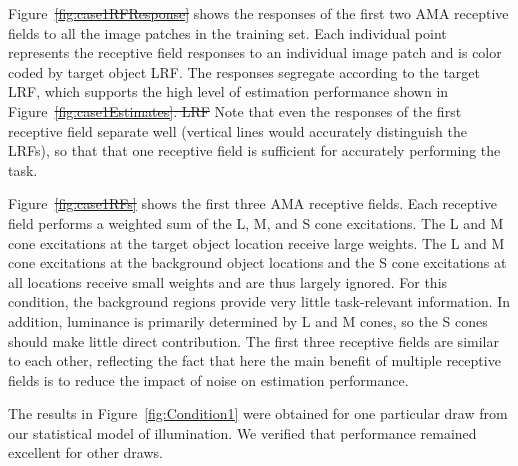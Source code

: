 \documentclass{jov}
\providecommand{\DIFaddtex}[1]{{\protect\color{blue}\uwave{#1}}} %
\providecommand{\DIFdeltex}[1]{{\protect\color{red}\sout{#1}}}                      %
\providecommand{\DIFaddbegin}{} %
\providecommand{\DIFaddend}{} %
\providecommand{\DIFdelbegin}{} %
\providecommand{\DIFdelend}{} %
\providecommand{\DIFadd}[1]{\texorpdfstring{\DIFaddtex{#1}}{#1}} %
\providecommand{\DIFdel}[1]{\texorpdfstring{\DIFdeltex{#1}}{}} %
\newcommand{\DIFscaledelfig}{0.5}
\newlength{\DIFdelgraphicswidth} %
\newlength{\DIFdelgraphicsheight} %
\newcommand{\DIFaddincludegraphics}[2][]{{\color{blue}\fbox{\DIFOincludegraphics[#1]{#2}}}} %
\newcommand{\DIFdelincludegraphics}[2][]{%
\sbox{\DIFdelgraphicsbox}{\DIFOincludegraphics[#1]{#2}}%
\settoboxwidth{\DIFdelgraphicswidth}{\DIFdelgraphicsbox} %
\settoboxtotalheight{\DIFdelgraphicsheight}{\DIFdelgraphicsbox} %
\scalebox{\DIFscaledelfig}{%
\parbox[b]{\DIFdelgraphicswidth}{\usebox{\DIFdelgraphicsbox}\\[-\baselineskip] \rule{\DIFdelgraphicswidth}{0em}}\llap{\resizebox{\DIFdelgraphicswidth}{\DIFdelgraphicsheight}{%
\setlength{\unitlength}{\DIFdelgraphicswidth}%
\begin{picture}(1,1)%
\thicklines\linethickness{2pt} %
{\color[rgb]{1,0,0}\put(0,0){\framebox(1,1){}}}%
{\color[rgb]{1,0,0}\put(0,0){\line( 1,1){1}}}%
{\color[rgb]{1,0,0}\put(0,1){\line(1,-1){1}}}%
\end{picture}%
}\hspace*{3pt}}} %
} %
\DeclareRobustCommand{\DIFaddbegin}{\DIFOaddbegin \let\includegraphics\DIFaddincludegraphics} %
\DeclareRobustCommand{\DIFaddend}{\DIFOaddend \let\includegraphics\DIFOincludegraphics} %
\DeclareRobustCommand{\DIFdelbegin}{\DIFOdelbegin \let\includegraphics\DIFdelincludegraphics} %
\DeclareRobustCommand{\DIFdelend}{\DIFOaddend \let\includegraphics\DIFOincludegraphics} %
\begin{document}
Figure~\DIFdelbegin \DIFdel{\ref{fig:case1RFResponse} }\DIFdelend \DIFaddbegin \DIFadd{\ref{fig:Condition1}b }\DIFaddend shows the responses of the first two AMA receptive fields to all the image patches in the training set.
Each individual point represents the receptive field responses to an individual image patch and
is color coded by target object LRF.
The responses segregate according to the target LRF, which supports the high level 
of estimation performance shown in Figure~\DIFdelbegin \DIFdel{\ref{fig:case1Estimates}.
LRF
}\DIFdelend \DIFaddbegin \DIFadd{\ref{fig:Condition1}a.
}\DIFaddend Note that even the responses of the first receptive field separate well (vertical lines would accurately
distinguish the LRFs), so that that one receptive field is sufficient for accurately performing the task.

Figure~\DIFdelbegin \DIFdel{\ref{fig:case1RFs} }\DIFdelend \DIFaddbegin \DIFadd{\ref{fig:Condition1}c }\DIFaddend shows the first three AMA receptive fields.
Each receptive field performs a weighted sum of the L, M, and S cone excitations.
The L and M cone excitations at the target object location receive large weights.
The L and M cone excitations at the background object locations and the S cone excitations at all locations receive small weights and are thus largely ignored. 
For this condition, the background regions provide very little task-relevant information. 
In addition, luminance is primarily determined by L and M cones, so the S cones should make little
direct contribution.
The first three receptive fields are similar to each other, reflecting the fact that here the main benefit
of multiple receptive fields is to reduce the impact of noise on estimation performance.

The results in Figure~\ref{fig:Condition1} were obtained for one particular draw from our statistical model of illumination.
We verified that performance remained excellent for other draws.
\end{document}
